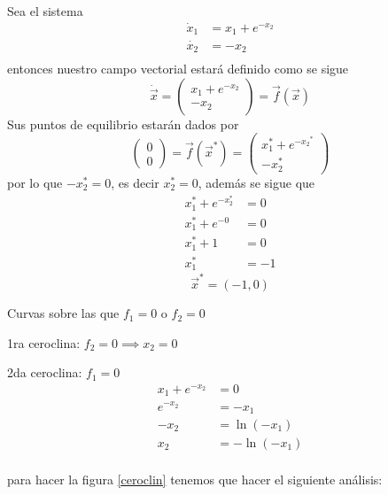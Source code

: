   
\begin{ejemplo} Sea el sistema $$
\begin{aligned}
  \dot{x}_1 &= x_1+e^{-x_2} \\ 
  \dot{x_2} &= -x_2 \\ 
\end{aligned}
$$
entonces nuestro campo vectorial estará definido como se sigue $$
\dot{\vec{x}}= \begin{pmatrix} x_1+e^{-x_2} \\ -x_2 \end{pmatrix} = \vec{f}(\vec{x})
$$
Sus puntos de equilibrio estarán dados por
\begin{equation}
  \begin{pmatrix} 0 \\ 0 \end{pmatrix} =  \vec{f}(\vec{x}^*)=\begin{pmatrix} x_1^*+e^{{-x_2}^*} \\ -x_2^* \end{pmatrix} 
\end{equation}
por lo que $-x_2^*=0$, es decir $x_2^*=0$, además se sigue que
$$
\begin{aligned}
    x_1^*+e^{-x_2^*} &= 0 \\
    x_1^* + e^{-0} &= 0 \\ 
    x_1^*+1 &= 0 \\
    x_1 ^* &= -1 
\end{aligned}
$$
$$
\vec{x}^* = (-1,0)
$$

\begin{tcolorbox}[colback=Black!4,colframe=White]
\begin{definicion}[Ceroclinas] Curvas sobre las que $f_1=0$ o $f_2=0$
\end{definicion}
\end{tcolorbox}


1ra ceroclina: $f_2=0 \implies x_2=0$ 

2da ceroclina: $f_1=0$
$$
\begin{aligned}
  x_1 + e^{-x_2}&=0 \\
  e^{-x_2} &= -x_1 \\ 
  -x_2 &= \ln(-x_1) \\ 
  x_2 &= -\ln(-x_1) \\ 
\end{aligned}
$$
\begin{figure}[H]
 \centering
  \vfill
\end{figure}
para hacer la figura \ref{ceroclin} tenemos que hacer el siguiente análisis:


\end{ejemplo}
